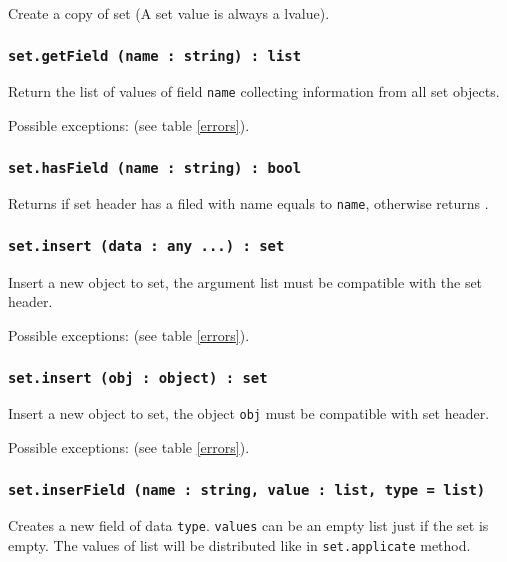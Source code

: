Create a copy of set (A set value is always a lvalue).

\subsubsection{\texttt{set.getField (name : string) : list}}

Return the list of values of field \texttt{name} collecting information from all set objects.

Possible exceptions:  (see table \ref{errors}).

\subsubsection{\texttt{set.hasField (name : string) : bool}}

Returns \true{} if set header has a filed with name equals to \texttt{name}, otherwise returns \false.

\subsubsection{\texttt{set.insert (data : any ...) : set}}

Insert a new object to set, the argument list must be compatible with the set header.

Possible exceptions:  (see table \ref{errors}).

\subsubsection{\texttt{set.insert (obj : object) : set}}

Insert a new object to set, the object \texttt{obj} must be compatible with set header.

Possible exceptions:  (see table \ref{errors}).

\subsubsection{\texttt{set.inserField (name : string, value : list, type = list)}}

Creates a new field of data \texttt{type}. \texttt{values} can be an empty list just if the set is empty. The values of list will be distributed like in \texttt{set.applicate} method.

